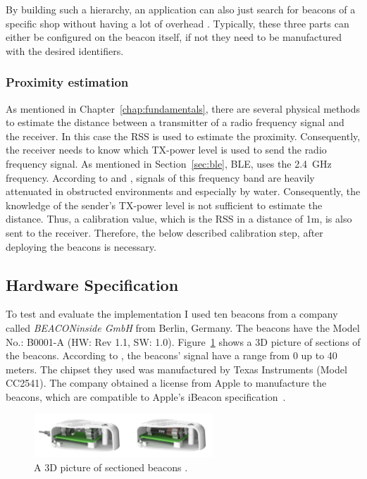 \noindent By building such a hierarchy, an application can also just search for beacons of a specific shop without having a lot of overhead \citep{apple:getting_started,binside:ds}. Typically, these three parts can either be configured on the beacon itself, if not they need to be manufactured with the desired identifiers.

\subsubsection*{Proximity estimation}
As mentioned in Chapter~\ref{chap:fundamentals}, there are several physical methods to estimate the distance between a transmitter of a radio frequency signal and the receiver. In this case the \acf{RSS} is used to estimate the proximity. Consequently, the receiver needs to know which \acs{TX}-power level is used to send the radio frequency signal. As mentioned in Section~\ref{sec:ble}, \ac{BLE}, uses the 2.4~GHz frequency. According to \citet{apple:getting_started} and \citet{binside:ds}, signals of this frequency band are heavily attenuated in obstructed environments and especially by water. Consequently, the knowledge of the sender's \acs{TX}-power level is not sufficient to estimate the distance. Thus, a calibration value, which is the \acl{RSS} in a distance of 1m, is also sent to the receiver. Therefore, the below described calibration step, after deploying the beacons is necessary.

\subsection{Hardware Specification}
To test and evaluate the implementation I used ten beacons from a company called \emph{BEACONinside GmbH} from Berlin, Germany. The beacons have the Model No.: B0001-A (HW: Rev 1.1, SW: 1.0). Figure~\ref{fig:bi:beacons} shows a 3D picture of sections of the beacons. According to \citet{binside:ds}, the beacons' signal have a range from 0 up to 40 meters. The chipset they used was manufactured by Texas Instruments (Model CC2541). The company obtained a license from Apple to manufacture the beacons, which are compatible to Apple's iBeacon specification~\citep{binside:ds}.

\begin{figure}
	\includegraphics[width=0.6\textwidth]{figures/BEACONinside_beacons}
	\caption{A 3D picture of sectioned beacons \citep{binside:ds}.}
	\label{fig:bi:beacons}
\end{figure}

